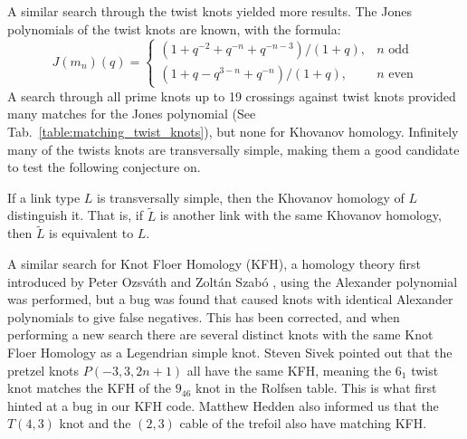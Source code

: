 A similar search through the twist knots yielded more results.
The Jones polynomials of the twist knots are known, with the formula:
\begin{equation}
    J(m_{n})(q)=
    \begin{cases}
        (1+q^{-2}+q^{-n}+q^{-n-3})/(1+q),&n\textrm{ odd}\\
        (1+q-q^{3-n}+q^{-n})/(1+q),&n\textrm{ even}
    \end{cases}
\end{equation}
A search through all prime knots up to 19 crossings against twist knots
provided many matches for the Jones polynomial
(See Tab.~\ref{table:matching_twist_knots}), but
none for Khovanov homology. Infinitely many of the twists knots are
transversally simple, making them a good candidate to test the following
conjecture on.
\begin{conjecture}
    If a link type $L$ is transversally simple, then the Khovanov
    homology of $L$ distinguish it. That is, if $\tilde{L}$
    is another link with the same Khovanov homology, then $\tilde{L}$ is
    equivalent to $L$.
\end{conjecture}
A similar search for Knot Floer Homology (KFH), a homology theory
first introduced by Peter Ozsv\'{a}th and Zolt\'{a}n Szab\'{o}
\cite{ozsvathszabo2004}, using the Alexander polynomial
was performed, but a bug was found that caused knots with identical
Alexander polynomials to give false negatives. This has been corrected,
and when performing a new search there are several distinct knots
with the same Knot Floer Homology as a Legendrian simple knot. Steven
Sivek pointed
out that the pretzel knots $P(-3,3,2n+1)$ all have the same KFH, meaning
the $6_{1}$ twist knot matches the KFH of the $9_{46}$ knot in the
Rolfsen table. This is what first hinted at a bug in our KFH code.
Matthew Hedden also informed us that the $T(4,3)$ knot and the
$(2,3)$ cable of the trefoil also have matching KFH.
